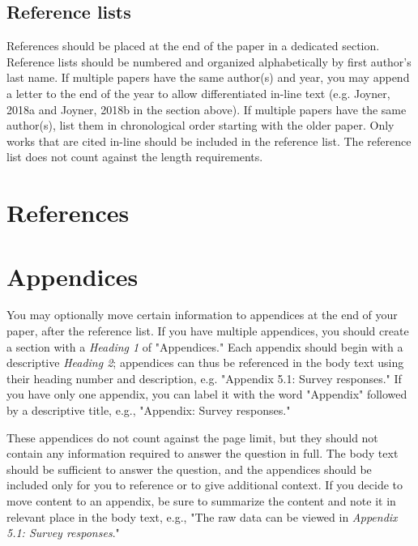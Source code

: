 \documentclass[
	letterpaper, %
]{jdf}
\begin{document}
\subsection{Reference lists}
References should be placed at the end of the paper in a dedicated section. Reference lists should be numbered and organized alphabetically by first author’s last name. If 
multiple papers have the same author(s) and year, you may append a letter to the end of the year to allow differentiated in-line text (e.g. Joyner, 2018a and Joyner, 2018b 
in the section above). If multiple papers have the same author(s), list them in chronological order starting with the older paper. Only works that are cited in-line should be 
included in the reference list. The reference list does not count against the length requirements.

\section{References}
\printbibliography[heading=none]

\section{Appendices}
You may optionally move certain information to appendices at the end of your paper, after the reference list. If you have multiple appendices, you should create a section 
with a \emph{Heading 1} of "Appendices." Each appendix should begin with a descriptive \emph{Heading 2}; appendices can thus be referenced in the body text using their 
heading number and description, e.g. "Appendix 5.1: Survey responses." If you have only one appendix, you can label it with the word "Appendix" followed by a descriptive 
title, e.g., "Appendix: Survey responses."

These appendices do not count against the page limit, but they should not contain any information required to answer the question in full. The body text should be sufficient 
to answer the question, and the appendices should be included only for you to reference or to give additional context. If you decide to move content to an appendix, be sure 
to summarize the content and note it in relevant place in the body text, e.g., "The raw data can be viewed in \emph{Appendix 5.1: Survey responses}."
\end{document}
